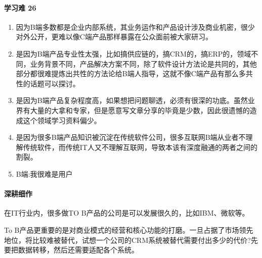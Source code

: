 \documentclass[letterpaper,10pt,english]{sphinxmanual}
\begin{document}
\paragraph{学习难 26\sphinxfootnotemark[80]}
\label{\detokenize{chapter_introduction/2B:id18}}%
\begin{footnotetext}[80]\sphinxAtStartFootnote
{}
%
\end{footnotetext}\ignorespaces \begin{enumerate}
%
\item {} 
因为B端多数都是企业内部系统，其业务运作和产品设计涉及商业机密，很少对外公开，更难以像C端产品那样暴露在公众面前被大家研习。

\item {} 
是因为B端产品专业性太强，比如搞供应链的，搞CRM的，搞ERP的，领域不同，业务背景不同，产品解决方案不同，除了软件设计方法论是共同的，其他部分都很难提炼出共性的方法论给B端人指导，这就不像C端产品有那么多共性的话题可以探讨。

\item {} 
是因为B端产品复杂程度高，如果想把问题聊透，必须有很深的功底。虽然业界有大量的大拿和专家，但是愿意写文章分享的毕竟是少数，因此很遗憾的造成这个领域学习资料偏少。

\item {} 
是因为很多B端产品知识被沉淀在传统软件公司，很多互联网B端从业者不理解传统软件，而传统IT人又不理解互联网，导致本该有深度融通的两者之间的割裂。

\item {} 
B端:我很难是用户

\end{enumerate}


\paragraph{深耕细作}
\label{\detokenize{chapter_introduction/2B:id19}}
在IT行业内，很多做TO
B产品的公司是可以发展很久的，比如IBM、微软等。%
\begin{footnote}[81]\sphinxAtStartFootnote
{}
%
\end{footnote}

To
B产品更重要的是对商业模式的经营和核心功能的打磨。一旦占据了市场领先地位，将比较难被替代，试想一个公司的CRM系统被替代需要付出多少的代价?先要把数据转移，然后还需要适配各个系统。
\end{document}
